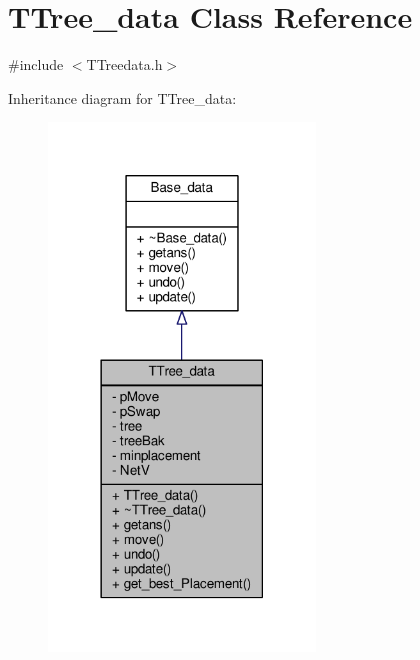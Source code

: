 \hypertarget{classTTree__data}{}\section{T\+Tree\+\_\+data Class Reference}
\label{classTTree__data}


{\ttfamily \#include $<$T\+Treedata.\+h$>$}



Inheritance diagram for T\+Tree\+\_\+data\+:
\nopagebreak
\begin{figure}[H]
\begin{center}
\leavevmode
\includegraphics[width=201pt]{classTTree__data__inherit__graph}
\end{center}
\end{figure}


